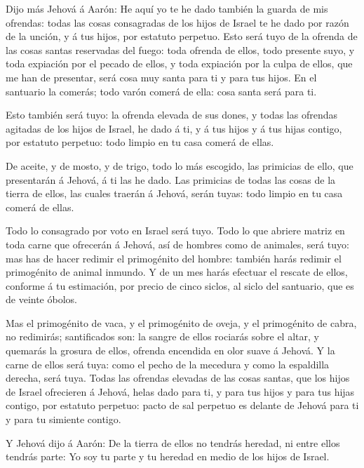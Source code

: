  Dijo más Jehová á Aarón: He aquí yo te he dado también la
guarda de mis ofrendas: todas las cosas consagradas de los hijos de
Israel te he dado por razón de la unción, y á tus hijos, por estatuto
perpetuo.  Esto será tuyo de la ofrenda de las cosas santas
reservadas del fuego: toda ofrenda de ellos, todo presente suyo, y toda
expiación por el pecado de ellos, y toda expiación por la culpa de
ellos, que me han de presentar, será cosa muy santa para ti y para tus
hijos.  En el santuario la comerás; todo varón comerá de
ella: cosa santa será para ti.

 Esto también será tuyo: la ofrenda elevada de sus dones, y
todas las ofrendas agitadas de los hijos de Israel, he dado á ti, y á
tus hijos y á tus hijas contigo, por estatuto perpetuo: todo limpio en
tu casa comerá de ellas.

 De aceite, y de mosto, y de trigo, todo lo más escogido,
las primicias de ello, que presentarán á Jehová, á ti las he dado.
 Las primicias de todas las cosas de la tierra de ellos,
las cuales traerán á Jehová, serán tuyas: todo limpio en tu casa comerá
de ellas.

 Todo lo consagrado por voto en Israel será tuyo.
 Todo lo que abriere matriz en toda carne que ofrecerán á
Jehová, así de hombres como de animales, será tuyo: mas has de hacer
redimir el primogénito del hombre: también harás redimir el primogénito
de animal inmundo.  Y de un mes harás efectuar el rescate
de ellos, conforme á tu estimación, por precio de cinco siclos, al siclo
del santuario, que es de veinte óbolos.

 Mas el primogénito de vaca, y el primogénito de oveja, y
el primogénito de cabra, no redimirás; santificados son: la sangre de
ellos rociarás sobre el altar, y quemarás la grosura de ellos, ofrenda
encendida en olor suave á Jehová.  Y la carne de ellos será
tuya: como el pecho de la mecedura y como la espaldilla derecha, será
tuya.  Todas las ofrendas elevadas de las cosas santas, que
los hijos de Israel ofrecieren á Jehová, helas dado para ti, y para tus
hijos y para tus hijas contigo, por estatuto perpetuo: pacto de sal
perpetuo es delante de Jehová para ti y para tu simiente contigo.

 Y Jehová dijo á Aarón: De la tierra de ellos no tendrás
heredad, ni entre ellos tendrás parte: Yo soy tu parte y tu heredad en
medio de los hijos de Israel.

